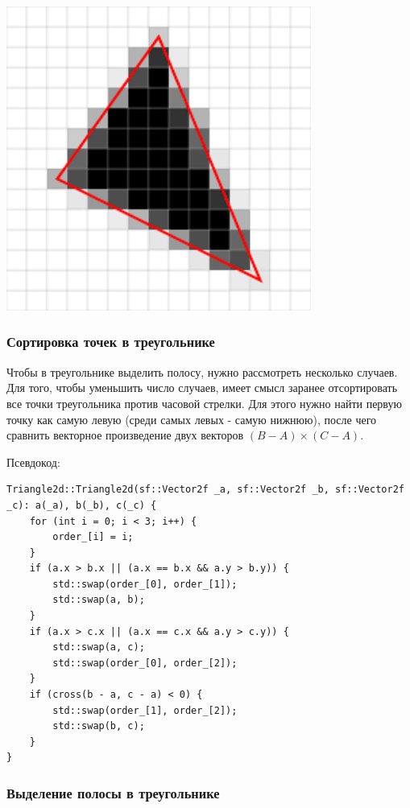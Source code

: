 \documentclass{article}
\begin{document}
\begin{center}
\includegraphics[width=10cm]{triangle.png}
\end{center}


\subsubsection{Сортировка точек в треугольнике}

Чтобы в треугольнике выделить полосу, нужно рассмотреть несколько случаев. Для того, чтобы уменьшить число случаев, имеет смысл заранее отсортировать все точки треугольника против часовой стрелки. Для этого нужно найти первую точку как самую левую (среди самых левых - самую нижнюю), после чего сравнить векторное произведение двух векторов $(B - A) \times (C - A)$.

Псевдокод:

\begin{verbatim}
Triangle2d::Triangle2d(sf::Vector2f _a, sf::Vector2f _b, sf::Vector2f _c): a(_a), b(_b), c(_c) {
    for (int i = 0; i < 3; i++) {
        order_[i] = i;
    }
    if (a.x > b.x || (a.x == b.x && a.y > b.y)) {
        std::swap(order_[0], order_[1]);
        std::swap(a, b);
    }
    if (a.x > c.x || (a.x == c.x && a.y > c.y)) {
        std::swap(a, c);
        std::swap(order_[0], order_[2]);
    }
    if (cross(b - a, c - a) < 0) {
        std::swap(order_[1], order_[2]);
        std::swap(b, c);
    }
}
\end{verbatim}

\subsubsection{Выделение полосы в треугольнике}
\end{document}
